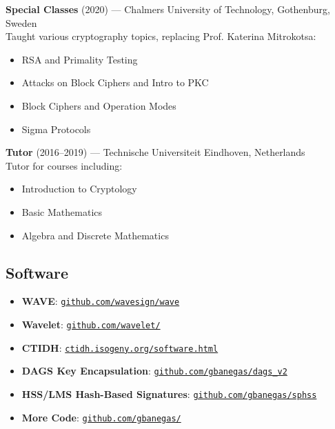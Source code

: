 \noindent
\textbf{Special Classes} (2020) — Chalmers University of Technology, Gothenburg, Sweden~\\ 
Taught various cryptography topics, replacing Prof. Katerina Mitrokotsa:  
\begin{itemize}
\item RSA and Primality Testing  
\item Attacks on Block Ciphers and Intro to PKC  
\item Block Ciphers and Operation Modes  
\item Sigma Protocols  
\end{itemize}

\noindent
\textbf{Tutor} (2016--2019) — Technische Universiteit Eindhoven, Netherlands ~\\ 
Tutor for courses including:  
\begin{itemize}
\item Introduction to Cryptology  
\item Basic Mathematics  
\item Algebra and Discrete Mathematics  
\end{itemize}


\subsection*{Software}

\small
\begin{itemize}
\setlength{\itemsep}{1pt}
    \item \textbf{WAVE}: \href{https://github.com/wavesign/wave}{\texttt{github.com/wavesign/wave}}
    \item \textbf{Wavelet}: \href{https://github.com/wavelet/}{\texttt{github.com/wavelet/}}
    \item \textbf{CTIDH}: \href{http://ctidh.isogeny.org/software.html}{\texttt{ctidh.isogeny.org/software.html}}
    \item \textbf{DAGS Key Encapsulation}: \href{https://github.com/gbanegas/dags_v2}{\texttt{github.com/gbanegas/dags\_v2}}
    \item \textbf{HSS/LMS Hash-Based Signatures}: \href{https://github.com/gbanegas/sphss}{\texttt{github.com/gbanegas/sphss}}
    \item \textbf{More Code}: \href{https://github.com/gbanegas/}{\texttt{github.com/gbanegas/}}
\end{itemize}


